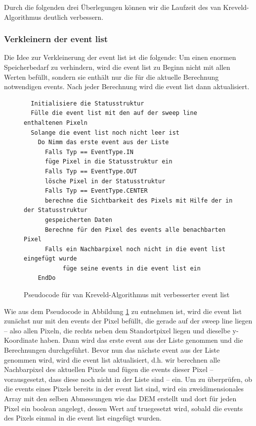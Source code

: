Durch die folgenden drei Überlegungen können wir die Laufzeit des van Kreveld-Algorithmus deutlich verbessern.

\subsubsection{Verkleinern der event list}
\label{ev_klein}
Die Idee zur Verkleinerung der event list ist die folgende: Um einen enormen Speicherbedarf zu verhindern, wird die event list zu Beginn nicht mit 
allen Werten befüllt, sondern sie enthält nur die für die aktuelle Berechnung notwendigen events. Nach jeder Berechnung wird die event list dann 
aktualisiert. 

\begin{figure}[!ht]
 \centering
 \begin{BVerbatim}
  Initialisiere die Statusstruktur 
  Fülle die event list mit den auf der sweep line enthaltenen Pixeln 
  Solange die event list noch nicht leer ist 
    Do Nimm das erste event aus der Liste 
      Falls Typ == EventType.IN
	  füge Pixel in die Statusstruktur ein
      Falls Typ == EventType.OUT
	  lösche Pixel in der Statusstruktur 
      Falls Typ == EventType.CENTER
	  berechne die Sichtbarkeit des Pixels mit Hilfe der in der Statusstruktur 
	  gespeicherten Daten
      Berechne für den Pixel des events alle benachbarten Pixel 
	  Falls ein Nachbarpixel noch nicht in die event list eingefügt wurde
	       füge seine events in die event list ein
    EndDo

 \end{BVerbatim}
 \caption{Pseudocode für van Kreveld-Algorithmus mit verbesserter event list}
 \label{pseudo_krev_ev_klein}
\end{figure}

Wie aus dem Pseudocode in Abbildung \ref{pseudo_krev_ev_klein} zu entnehmen ist, wird die event list zunächst nur mit den events der Pixel befüllt,
die gerade auf der sweep line liegen -- also allen Pixeln, die rechts neben dem Standortpixel liegen und dieselbe y-Koordinate haben. Dann wird das 
erste event aus der Liste genommen und die Berechnungen durchgeführt. Bevor nun das nächste event aus der Liste genommen wird, wird die event list 
aktualisiert, d.h. wir berechnen alle Nachbarpixel des aktuellen Pixels und fügen die events dieser Pixel -- vorausgesetzt, dass diese noch nicht in 
der Liste sind -- ein. Um zu überprüfen, ob die events eines Pixels bereits in der event list sind, wird ein zweidimensionales Array mit 
den selben Abmessungen wie das DEM erstellt und dort für jeden Pixel ein boolean angelegt, dessen Wert auf \glqq true\grqq gesetzt wird, sobald die events 
des Pixels einmal in die event list eingefügt wurden.

